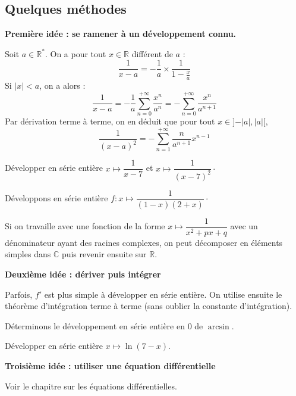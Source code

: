 \documentclass[french,11pt,twoside]{VcCours}
\begin{document}
%
%

\newpage
\subsection{Quelques méthodes}
\textbf{Première idée : se ramener à un développement connu.}

Soit $a \in \mathbb{R}^{*}$. On a pour tout $x \in \mathbb{R}$ différent de $a$ :
$$ \dfrac{1}{x-a} = - \dfrac{1}{a} \times \dfrac{1}{1- \frac{x}{a}}$$
Si $\vert x \vert <a$, on a alors :
$$ \dfrac{1}{x-a} = - \dfrac{1}{a} \sum_{n=0}^{+ \infty} \dfrac{x^n}{a^n} = -\sum_{n=0}^{+ \infty} \dfrac{x^n}{a^{n+1}}$$
Par dérivation terme à terme, on en déduit que pour tout $x \in ]-\vert a \vert, \vert a \vert[$,
$$ \dfrac{1}{(x-a)^2} = - \sum_{n=1}^{+ \infty} \dfrac{n}{a^{n+1}} x^{n-1}$$

\begin{ApplicationDirecte}{} Développer en série entière $x \mapsto \dfrac{1}{x-7}$ et $x \mapsto \dfrac{1}{(x-7)^2}\cdot$
\end{ApplicationDirecte}

\begin{Exemple}{} Développons en série entière $f : x \mapsto \dfrac{1}{(1-x)(2+x)}\cdot$

    \newpage


\end{Exemple}

\begin{Remarque}{} Si on travaille avec une fonction de la forme $x \mapsto \dfrac{1}{x^2+px+q}$ avec un dénominateur ayant des racines complexes, on peut décomposer en éléments simples dans $\mathbb{C}$ puis revenir ensuite sur $\mathbb{R}$.
\end{Remarque}

\medskip


\textbf{Deuxième idée : dériver puis intégrer}

Parfois, $f'$ est plus simple à développer en série entière. On utilise ensuite le théorème d'intégration terme à terme (sans oublier la constante d'intégration).


\begin{Exemple}{} Déterminons le développement en série entière en $0$ de $\arcsin$.



\end{Exemple}

\begin{ApplicationDirecte}{} Développer en série entière $x \mapsto \ln(7-x)$.
\end{ApplicationDirecte}

\medskip

\textbf{Troisième idée : utiliser une équation différentielle}

Voir le chapitre sur les équations différentielles.
\end{document}
